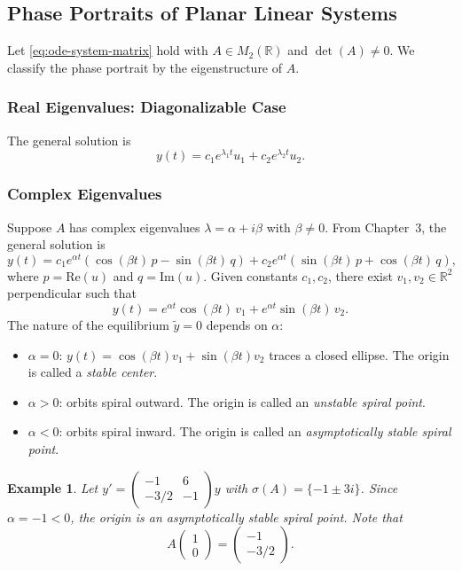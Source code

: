 \documentclass{article}
\newtheorem*{example}{Example}
\newcommand{\R}{\mathbb{R}}
\begin{document}
\subsection{Phase Portraits of Planar Linear Systems}

Let \eqref{eq:ode-system-matrix} hold with $A \in M_2(\R)$ 
and $\det(A) \neq 0$. We classify the phase portrait by the 
eigenstructure of $A$.

\subsubsection{Real Eigenvalues: Diagonalizable Case}

The general solution is
\[y(t) = c_1 e^{\lambda_1 t}u_1 + c_2 e^{\lambda_2 t}u_2.\]

\subsubsection{Complex Eigenvalues}

Suppose $A$ has complex eigenvalues $\lambda = \alpha + i\beta$ 
with $\beta \neq 0$. From Chapter~3, the general solution is
\[y(t) = c_1 e^{\alpha t}(\cos(\beta t)\,p - \sin(\beta t)\,q) 
+ c_2 e^{\alpha t}(\sin(\beta t)\,p + \cos(\beta t)\,q),\]
where $p = \mathrm{Re}(u)$ and $q = \mathrm{Im}(u)$. 
Given constants $c_1, c_2$, there exist $v_1, v_2 \in \R^2$ 
perpendicular such that
\[y(t) = e^{\alpha t}\cos(\beta t)\,v_1 + 
e^{\alpha t}\sin(\beta t)\,v_2.\]
The nature of the equilibrium $\tilde{y} = 0$ depends on $\alpha$:
\begin{itemize}
    \item $\alpha = 0$: $y(t) = \cos(\beta t)v_1 + \sin(\beta t)v_2$ 
    traces a closed ellipse. The origin is called a 
    \emph{stable center}.
    \item $\alpha > 0$: orbits spiral outward. The origin is called 
    an \emph{unstable spiral point}.
    \item $\alpha < 0$: orbits spiral inward. The origin is called 
    an \emph{asymptotically stable spiral point}.
\end{itemize}

\begin{example}
    Let $y' = \begin{pmatrix}-1&6\\-3/2&-1\end{pmatrix}y$ with 
    $\sigma(A) = \{-1 \pm 3i\}$. Since $\alpha = -1 < 0$, the 
    origin is an asymptotically stable spiral point. Note that
    \[A\begin{pmatrix}1\\0\end{pmatrix} = 
    \begin{pmatrix}-1\\-3/2\end{pmatrix}.\]
\end{example}
\end{document}
